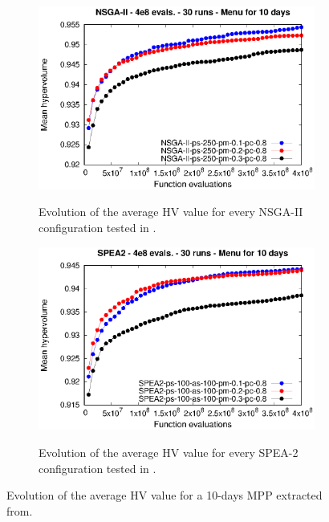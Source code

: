 \begin{figure}[H]
\begin{subfigure}{.5\textwidth}
  \centering
  \includegraphics[width=1.0\linewidth]{../references/meanHV_Evolution_NSGA2_days_10.eps}
  \label{fig:sfig1}
    \caption{Evolution of the average HV value for every NSGA-II configuration tested in \cite{Miranda2018}.}
\end{subfigure}%
\begin{subfigure}{.5\textwidth}
  \centering
  \includegraphics[width=1.0\linewidth]{../references/meanHV_Evolution_SPEA2_days_10.eps}
  \label{fig:sfig2}
  \caption{Evolution of the average HV value for every SPEA-2 configuration tested in \cite{Miranda2018}.}
\end{subfigure}
\caption{Evolution of the average HV value for a 10-days MPP extracted from\cite{Miranda2018}.}
\label{fig:fig}
\end{figure}
